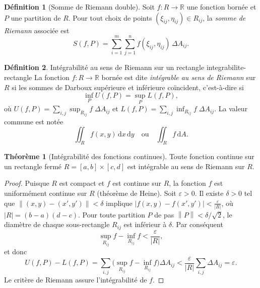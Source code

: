\documentclass[12pt,a4paper,openany]{book}
\theoremstyle{definition}
\newtheorem{definition}{Définition}[chapter]
\newtheorem{theoreme}{Théorème}[chapter]
\newcommand{\R}{\mathbb{R}}
\newcommand{\eps}{\varepsilon}
\newcommand{\abs}[1]{\left\lvert #1 \right\rvert}
\newcommand{\norm}[1]{\left\lVert #1 \right\rVert}
\newcommand{\dd}{\mathrm{d}}
\begin{document}
\begin{definition}[Somme de Riemann double]\label{def:somme-riemann-2d}
  Soit $f\colon R \to \R$ une fonction bornée et $P$ une partition de $R$.
  Pour tout choix de points $(\xi_{ij}, \eta_{ij}) \in R_{ij}$, la
  \emph{somme de Riemann} associée est
  \[
    S(f, P) = \sum_{i=1}^{m}\sum_{j=1}^{n} f(\xi_{ij}, \eta_{ij})\,
    \Delta A_{ij}.
  \]
\end{definition}

\begin{definition}{Intégrabilité au sens de Riemann sur un rectangle}%
  {integrabilite-rectangle}
  La fonction $f\colon R \to \R$ bornée est dite \emph{intégrable au
  sens de Riemann} sur $R$ si les sommes de Darboux supérieure et
  inférieure coïncident, c'est-à-dire si
  \[
    \inf_P U(f,P) = \sup_P L(f,P),
  \]
  où $U(f,P) = \sum_{i,j}\sup_{R_{ij}}f\;\Delta A_{ij}$ et
  $L(f,P) = \sum_{i,j}\inf_{R_{ij}}f\;\Delta A_{ij}$. La valeur
  commune est notée
  \[
    \iint_R f(x,y)\,\dd x\,\dd y
    \quad\text{ou}\quad
    \iint_R f\,\dd A.
  \]
\end{definition}

\begin{theoreme}[Intégrabilité des fonctions continues]
  \label{thm:continue-integrable-2d}
  Toute fonction continue sur un rectangle fermé $R = [a,b]\times[c,d]$
  est intégrable au sens de Riemann sur $R$.
\end{theoreme}

\begin{proof}
  Puisque $R$ est compact et $f$ est continue sur $R$, la fonction $f$
  est uniformément continue sur $R$ (théorème de Heine). Soit $\eps > 0$.
  Il existe $\delta > 0$ tel que $\norm{(x,y)-(x',y')} < \delta$
  implique $\abs{f(x,y)-f(x',y')} < \frac{\eps}{\abs{R}}$, où
  $\abs{R} = (b-a)(d-c)$. Pour toute partition $P$ de pas
  $\norm{P} < \delta/\sqrt{2}$, le diamètre de chaque sous-rectangle
  $R_{ij}$ est inférieur à $\delta$. Par conséquent
  \[
    \sup_{R_{ij}} f - \inf_{R_{ij}} f < \frac{\eps}{\abs{R}},
  \]
  et donc
  \[
    U(f,P) - L(f,P) = \sum_{i,j}\bigl(\sup_{R_{ij}}f -
    \inf_{R_{ij}}f\bigr)\Delta A_{ij}
    < \frac{\eps}{\abs{R}} \sum_{i,j} \Delta A_{ij} = \eps.
  \]
  Le critère de Riemann assure l'intégrabilité de $f$.
\end{proof}


\end{document}
